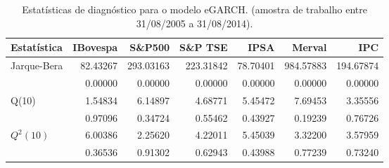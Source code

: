 \begin{table}[H]
\centering
\caption{Estatísticas de diagnóstico para o modelo eGARCH. 
               (amostra de trabalho entre 31/08/2005 a 31/08/2014).} 
\label{tab:garchstats}
\begin{tabular}{lrrrrrr}
  \hline
Estatística & IBovespa & S\&P500 & S\&P TSE & IPSA & Merval & IPC \\ 
  \hline
Jarque-Bera & 82.43267 & 293.03163 & 223.31842 & 78.70401 & 984.57883 & 194.67874 \\ 
   & 0.00000 & 0.00000 & 0.00000 & 0.00000 & 0.00000 & 0.00000 \\ 
  Q(10) & 1.54834 & 6.14897 & 4.68771 & 5.45472 & 7.69453 & 3.35556 \\ 
   & 0.97096 & 0.34724 & 0.55462 & 0.43927 & 0.19239 & 0.76726 \\ 
  $Q^2(10)$ & 6.00386 & 2.25620 & 4.22011 & 5.45039 & 3.32200 & 3.57959 \\ 
   & 0.36536 & 0.91302 & 0.62943 & 0.43988 & 0.77239 & 0.73240 \\ 
   \hline
\end{tabular}
\end{table}
